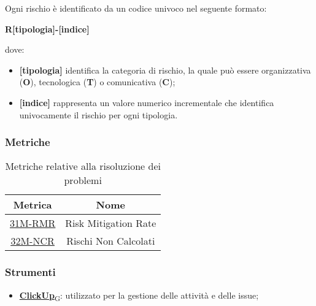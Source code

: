Ogni rischio è identificato da un codice univoco nel seguente formato:
\begin{center}
	\textbf{R[tipologia]-[indice]}
\end{center}
dove:
\begin{itemize}
	\item \textbf{[tipologia]} identifica la categoria di rischio, la quale può essere organizzativa (\textbf{O}), tecnologica (\textbf{T}) o comunicativa (\textbf{C});
	\item \textbf{[indice]} rappresenta un valore numerico incrementale che identifica univocamente il rischio per ogni tipologia.
\end{itemize}

\newpage
\subsubsection{Metriche}
\begin{table}[h]
	\centering
	\begin{tabular}{|c|c|}
		\hline
		\textbf{Metrica} & \textbf{Nome}        						\\
		\hline
		\underline{\hyperlink{31M}{31M-RMR}}   &  Risk Mitigation Rate  \\
		\underline{\hyperlink{32M}{32M-NCR}}   &  Rischi Non Calcolati  \\
		\hline
	\end{tabular}
	\caption{Metriche relative alla risoluzione dei problemi}
\end{table}

\subsubsection{Strumenti}
\begin{itemize}
	\item \href{https://7last.github.io/docs/rtb/documentazione-interna/glossario\#clickup}{\textbf{ClickUp}\textsubscript{G}}: utilizzato per la gestione delle attività e delle issue;
\end{itemize}
